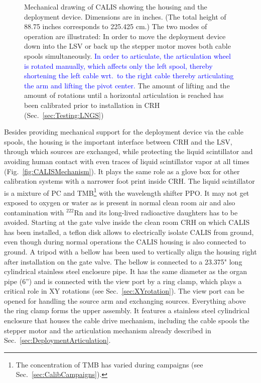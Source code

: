 \begin{figure}[htbp]
 \caption{Mechanical drawing of CALIS showing the housing and the deployment device. Dimensions are in inches. (The total height of 88.75 inches corresponds to 225.425 cm.) The two modes of operation are illustrated: In order to move the deployment device down into the LSV or back up the stepper motor moves both cable spools simultaneously. \textcolor{blue}{In order to articulate, the articulation wheel is rotated manually, which affects only the left spool, thereby shortening the left cable wrt.~to the right cable thereby articulating the arm and lifting the pivot center.} The amount of lifting and the amount of rotations until a horizontal articulation is reached has been calibrated prior to installation in CRH (Sec.~\ref{sec:Testing:LNGS})\label{fig:CALISDimensions}\label{fig:CALISMechanism}\label{fig:gearDrawing}
}
\end{figure}

Besides providing mechanical support for the deployment device via the cable spools, the housing is the important interface between CRH and the LSV, through which sources are exchanged, while protecting the liquid scintillator and avoiding human contact with even traces of liquid scintillator vapor at all times (Fig.~\ref{fig:CALISMechanism}). It plays the same role as a glove box for other calibration systems with a narrower foot print inside CRH. The liquid scintillator is a mixture of PC and TMB\footnote{The concentration of TMB has varied during campaigns (see Sec.~\ref{sec:CalibCampaigns}).} with the wavelength shifter PPO\cite{vetoPaper}. It may not get exposed to oxygen or water as is present in normal clean room air and also contamination with $^{222}$Rn and its long-lived radioactive daughters has to be avoided. 
Starting at the gate valve inside the clean room CRH on which CALIS has been installed, a teflon disk allows to electrically isolate CALIS from ground, even though during normal operations the CALIS housing is also connected to ground. A tripod with a bellow has been used to vertically align the housing right after installation on the gate valve. The bellow is connected to a 23.375" long cylindrical stainless steel enclosure pipe. It has the same diameter as the organ pipe (6'') and is connected with the view port by a ring clamp, which plays a critical role in XY rotations (see Sec.~\ref{sec:XYrotation}). The view port can be opened for handling the source arm and exchanging sources. Everything above the ring clamp forms the upper assembly. It features a stainless steel cylindrical enclosure that houses the cable drive mechanism, including the cable spools the stepper motor and the articulation mechanism already described in Sec.~\ref{sec:DeploymentArticulation}. 

